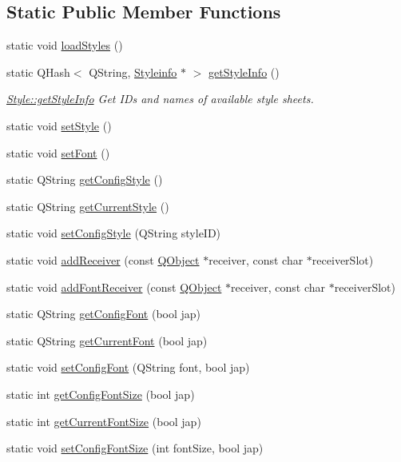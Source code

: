 \subsection*{Static Public Member Functions}
\begin{DoxyCompactItemize}
\item 
static void \hyperlink{class_style_aba44fc6be77df65cfd35b4b27e7f61d7}{load\+Styles} ()
\item 
static Q\+Hash$<$ Q\+String, \hyperlink{class_styleinfo}{Styleinfo} $\ast$ $>$ \hyperlink{class_style_aeffeb1681c983c1b3648ec72feb46966}{get\+Style\+Info} ()
\begin{DoxyCompactList}\small\item\em \hyperlink{class_style_aeffeb1681c983c1b3648ec72feb46966}{Style\+::get\+Style\+Info} Get ID\textquotesingle{}s and names of available style sheets. \end{DoxyCompactList}\item 
static void \hyperlink{class_style_aef8e6319350f1bf38c76980b23f0cd46}{set\+Style} ()
\item 
static void \hyperlink{class_style_aa2e2b0c10d7b116d3261158d83b5784a}{set\+Font} ()
\item 
static Q\+String \hyperlink{class_style_aa325b448902938a20f599eeb522a01b3}{get\+Config\+Style} ()
\item 
static Q\+String \hyperlink{class_style_a49604c44594ba8902451672a7d9f0b75}{get\+Current\+Style} ()
\item 
static void \hyperlink{class_style_acfb0a050e2995247f196a2dc94720b32}{set\+Config\+Style} (Q\+String style\+ID)
\item 
static void \hyperlink{class_style_a1086ec80b4ca63d43e5c1f3544a04109}{add\+Receiver} (const \hyperlink{class_q_object}{Q\+Object} $\ast$receiver, const char $\ast$receiver\+Slot)
\item 
static void \hyperlink{class_style_ad318e6ab475524bf67b1034c7770559e}{add\+Font\+Receiver} (const \hyperlink{class_q_object}{Q\+Object} $\ast$receiver, const char $\ast$receiver\+Slot)
\item 
static Q\+String \hyperlink{class_style_a350af48bd7123d91251c4b0c9d07d75e}{get\+Config\+Font} (bool jap)
\item 
static Q\+String \hyperlink{class_style_a3437664ebef7c3c470635b7581a47f9e}{get\+Current\+Font} (bool jap)
\item 
static void \hyperlink{class_style_a4a5238e6c153a9b8dececbea223d4ae8}{set\+Config\+Font} (Q\+String font, bool jap)
\item 
static int \hyperlink{class_style_a27c49fbae999ac6159374d12fe8737bb}{get\+Config\+Font\+Size} (bool jap)
\item 
static int \hyperlink{class_style_a75598212a2b2a73d11ad7ba7b40d5982}{get\+Current\+Font\+Size} (bool jap)
\item 
static void \hyperlink{class_style_ac927fbfccc3c4073fb48d5c07fddcb0c}{set\+Config\+Font\+Size} (int font\+Size, bool jap)
\end{DoxyCompactItemize}


